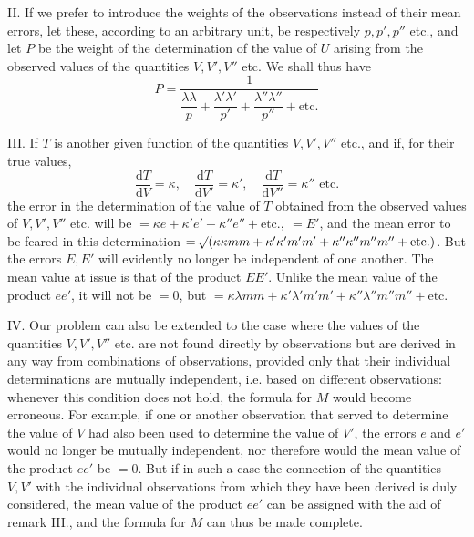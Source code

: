 II. If we prefer to introduce the weights of the observations instead of their mean errors, let these, according to an arbitrary unit, be respectively \(p,p',p''\) etc., and let \(P\) be the weight of the determination of the value of \(U\) arising from the observed values of the quantities \(V,V',V''\) etc. We shall thus have
\[
P=\frac{1}{\dfrac{\lambda\lambda}{p}+\dfrac{\lambda'\lambda'}{p'}+\dfrac{\lambda''\lambda''}{p''}+\text{etc.}}
\]

III. If \(T\) is another given function of the quantities \(V,V',V''\) etc., and if, for their true values,
\[
\frac{\mathrm{d}T}{\mathrm{d}V}=\kappa,\quad\frac{\mathrm{d}T}{\mathrm{d}V'}=\kappa',\quad\frac{\mathrm{d}T}{\mathrm{d}V''}=\kappa''\text{ etc.}
\]
the error in the determination of the value of \(T\) obtained from the observed values of \(V,V',V''\) etc. will be \(=\kappa e+\kappa'e'+\kappa''e''+\text{etc.},\ =E'\), and the mean error to be feared in this determination \(=\mathord{{}^{}\!\surd}(\kappa\kappa mm+\kappa'\kappa'm'm'+\kappa''\kappa''m''m''+\text{etc.})\). But the errors \(E,E'\) will evidently no longer be independent of one another. The mean value at issue is that of the product \(EE'\). Unlike the mean value of the product \(ee'\), it will not be \(=0\), but \(=\kappa\lambda mm+\kappa'\lambda'm'm'+\kappa''\lambda''m''m''+\text{etc.}\)

IV. Our problem can also be extended to the case where the values of the quantities \(V,V',V''\) etc. are not found directly by observations but are derived in any way from combinations of observations, provided only that their individual determinations are mutually independent, i.e. based on different observations: whenever this condition does not hold, the formula for \(M\) would become erroneous. For example, if one or another observation that served to determine the value of \(V\) had also been used to determine the value of \(V'\), the errors \(e\) and \(e'\) would no longer be mutually independent, nor therefore would the mean value of the product \(ee'\) be \(=0\). But if in such a case the connection of the quantities \(V,V'\) with the individual observations from which they have been derived is duly considered, the mean value of the product \(ee'\) can be assigned with the aid of remark III., and the formula for \(M\) can thus be made complete.

